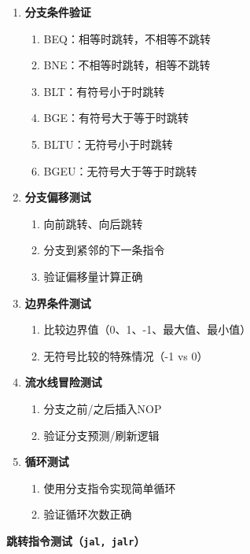 \documentclass[12pt,a4paper]{ctexart}
\newcommand{\code}[1]{\texttt{#1}}
\begin{document}
\begin{enumerate}
    \item \textbf{分支条件验证}
    \begin{enumerate}
        \item BEQ：相等时跳转，不相等不跳转
        \item BNE：不相等时跳转，相等不跳转
        \item BLT：有符号小于时跳转
        \item BGE：有符号大于等于时跳转
        \item BLTU：无符号小于时跳转
        \item BGEU：无符号大于等于时跳转
    \end{enumerate}
    
    \item \textbf{分支偏移测试}
    \begin{enumerate}
        \item 向前跳转、向后跳转
        \item 分支到紧邻的下一条指令
        \item 验证偏移量计算正确
    \end{enumerate}
    
    \item \textbf{边界条件测试}
    \begin{enumerate}
        \item 比较边界值（0、1、-1、最大值、最小值）
        \item 无符号比较的特殊情况（-1 vs 0）
    \end{enumerate}
    
    \item \textbf{流水线冒险测试}
    \begin{enumerate}
        \item 分支之前/之后插入NOP
        \item 验证分支预测/刷新逻辑
    \end{enumerate}
    
    \item \textbf{循环测试}
    \begin{enumerate}
        \item 使用分支指令实现简单循环
        \item 验证循环次数正确
    \end{enumerate}
\end{enumerate}

\textbf{跳转指令测试（\code{jal, jalr}）}
\end{document}

